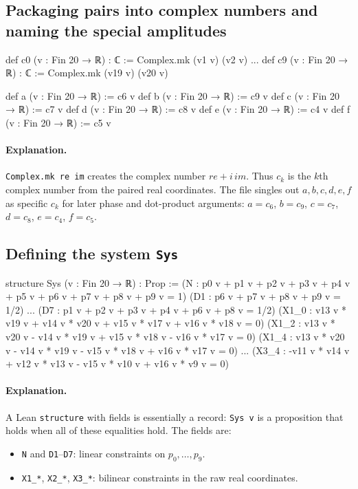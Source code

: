 \documentclass[11pt]{article}
\begin{document}
\subsection*{Packaging pairs into complex numbers and naming the special amplitudes}

\begin{LeanCode}
def c0 (v : Fin 20 → ℝ) : ℂ := Complex.mk (v1 v) (v2 v)
...
def c9 (v : Fin 20 → ℝ) : ℂ := Complex.mk (v19 v) (v20 v)

def a (v : Fin 20 → ℝ) := c6 v
def b (v : Fin 20 → ℝ) := c9 v
def c (v : Fin 20 → ℝ) := c7 v
def d (v : Fin 20 → ℝ) := c8 v
def e (v : Fin 20 → ℝ) := c4 v
def f (v : Fin 20 → ℝ) := c5 v
\end{LeanCode}

\paragraph{Explanation.}
\texttt{Complex.mk re im} creates the complex number $re+i\,im$.
Thus $c_k$ is the $k$th complex number from the paired real coordinates.
The file singles out $a,b,c,d,e,f$ as specific $c_k$ for later phase and dot-product arguments:
$a=c_6$, $b=c_9$, $c=c_7$, $d=c_8$, $e=c_4$, $f=c_5$.

\subsection*{Defining the system \texttt{Sys}}

\begin{LeanCode}
structure Sys (v : Fin 20 → ℝ) : Prop :=
  (N  : p0 v + p1 v + p2 v + p3 v + p4 v + p5 v + p6 v + p7 v + p8 v + p9 v = 1)
  (D1 : p6 v + p7 v + p8 v + p9 v = 1/2)
  ...
  (D7 : p1 v + p2 v + p3 v + p4 v + p6 v + p8 v = 1/2)
  (X1_0 : v13 v * v19 v + v14 v * v20 v + v15 v * v17 v + v16 v * v18 v = 0)
  (X1_2 : v13 v * v20 v - v14 v * v19 v + v15 v * v18 v - v16 v * v17 v = 0)
  (X1_4 : v13 v * v20 v - v14 v * v19 v - v15 v * v18 v + v16 v * v17 v = 0)
  ...
  (X3_4 : -v11 v * v14 v + v12 v * v13 v - v15 v * v10 v + v16 v * v9 v = 0)
\end{LeanCode}

\paragraph{Explanation.}
A Lean \texttt{structure} with fields is essentially a record: \texttt{Sys v} is a proposition that holds when all of these equalities hold.
The fields are:
\begin{itemize}
\item \texttt{N} and \texttt{D1}--\texttt{D7}: linear constraints on $p_0,\dots,p_9$.
\item \texttt{X1\_*}, \texttt{X2\_*}, \texttt{X3\_*}: bilinear constraints in the raw real coordinates.
\end{itemize}
\end{document}
